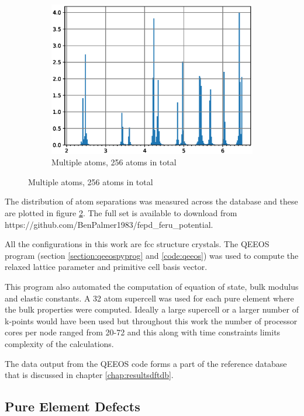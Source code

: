 \begin{figure}
\begin{subfigure}{.32\textwidth}
  \includegraphics[width=.94\linewidth]{chapters/potentials_fe_pd_ru/neighbour_distances/db_feru_neighbours.eps}  
  \caption{Multiple atoms, 256 atoms in total}
  \label{fig:sub-first}
\end{subfigure}
\label{fig:dbneighbourseparations}
\end{figure}

The distribution of atom separations was measured across the database and these are plotted in figure \ref{fig:dbneighbourseparations}.  The full set is available to download from https://github.com/BenPalmer1983/fepd\_feru\_potential.

All the configurations in this work are \acrshort{fcc} structure crystals.  The QEEOS program (section \ref{section:qeeospyprog} and \ref{code:qeeos}) was used to compute the relaxed lattice parameter and primitive cell basis vector.

This program also automated the computation of equation of state, bulk modulus and elastic constants.  A 32 atom supercell was used for each pure element where the bulk properties were computed.  Ideally a large supercell or a larger number of k-points would have been used but throughout this work the number of processor cores per node ranged from 20-72 and this along with time constraints limits complexity of the calculations.

The data output from the QEEOS code forms a part of the reference database that is discussed in chapter \ref{chap:resultsdftdb}.





\subsection{Pure Element Defects}

